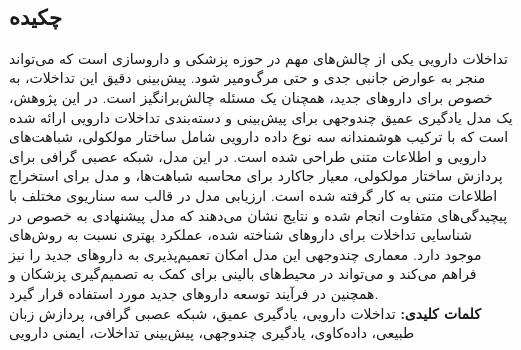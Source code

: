 
\setcounter{page}{1}
\thispagestyle{empty}

~\vfill

\subsection*{چکیده}
\begin{small}
\baselineskip=0.7cm

تداخلات دارویی یکی از چالش‌های مهم در حوزه پزشکی و داروسازی است که می‌تواند منجر به عوارض جانبی جدی و حتی مرگ‌ومیر شود. پیش‌بینی دقیق این تداخلات، به خصوص برای داروهای جدید، همچنان یک مسئله چالش‌برانگیز است. در این پژوهش، یک مدل یادگیری عمیق چندوجهی برای پیش‌بینی و دسته‌بندی تداخلات دارویی ارائه شده است که با ترکیب هوشمندانه سه نوع داده دارویی شامل ساختار مولکولی، شباهت‌های دارویی و اطلاعات متنی طراحی شده است. در این مدل، شبکه عصبی گرافی برای پردازش ساختار مولکولی، معیار جاکارد برای محاسبه شباهت‌ها، و مدل  برای استخراج اطلاعات متنی به کار گرفته شده است. ارزیابی مدل در قالب سه سناریوی مختلف با پیچیدگی‌های متفاوت انجام شده و نتایج نشان می‌دهند که مدل پیشنهادی به خصوص در شناسایی تداخلات برای داروهای شناخته شده، عملکرد بهتری نسبت به روش‌های موجود دارد. معماری چندوجهی این مدل امکان تعمیم‌پذیری به داروهای جدید را نیز فراهم می‌کند و می‌تواند در محیط‌های بالینی برای کمک به تصمیم‌گیری پزشکان و همچنین در فرآیند توسعه داروهای جدید مورد استفاده قرار گیرد. \\

\noindent\textbf{کلمات کلیدی:} تداخلات دارویی، یادگیری عمیق، شبکه عصبی گرافی، پردازش زبان طبیعی، داده‌کاوی، یادگیری چندوجهی، پیش‌بینی تداخلات، ایمنی دارویی
\end{small}